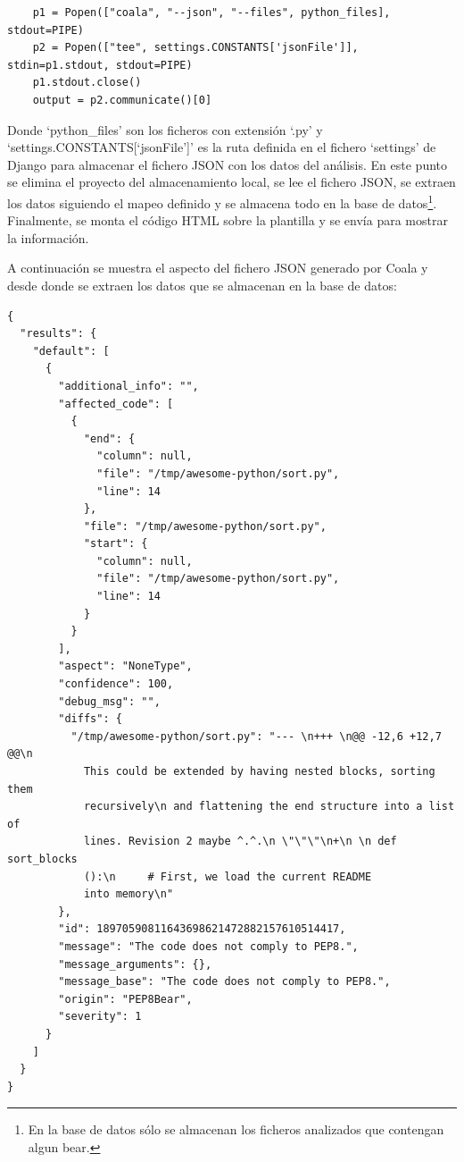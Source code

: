 \documentclass[a4paper, 12pt]{book}
\begin{document}
{\footnotesize
\begin{verbatim}
    p1 = Popen(["coala", "--json", "--files", python_files], stdout=PIPE)
    p2 = Popen(["tee", settings.CONSTANTS['jsonFile']], stdin=p1.stdout, stdout=PIPE)
    p1.stdout.close()
    output = p2.communicate()[0]
\end{verbatim}
}

Donde `python\_files' son los ficheros con extensión `.py' y `settings.CONSTANTS[`jsonFile']' es la ruta definida en el fichero `settings' de Django para almacenar el fichero JSON con los datos del análisis. En este punto se elimina el proyecto del almacenamiento local, se lee el fichero JSON, se extraen los datos siguiendo el mapeo definido y se almacena todo en la base de datos\footnote{En la base de datos sólo se almacenan los ficheros analizados que contengan algun bear.}. Finalmente, se monta el código HTML sobre la plantilla y se envía para mostrar la información.

A continuación se muestra el aspecto del fichero JSON generado por Coala y desde donde se extraen los datos que se almacenan en la base de datos:

{\footnotesize
\begin{verbatim}
{
  "results": {
    "default": [
      {
        "additional_info": "",
        "affected_code": [
          {
            "end": {
              "column": null,
              "file": "/tmp/awesome-python/sort.py",
              "line": 14
            },
            "file": "/tmp/awesome-python/sort.py",
            "start": {
              "column": null,
              "file": "/tmp/awesome-python/sort.py",
              "line": 14
            }
          }
        ],
        "aspect": "NoneType",
        "confidence": 100,
        "debug_msg": "",
        "diffs": {
          "/tmp/awesome-python/sort.py": "--- \n+++ \n@@ -12,6 +12,7 @@\n     
            This could be extended by having nested blocks, sorting them 
            recursively\n and flattening the end structure into a list of 
            lines. Revision 2 maybe ^.^.\n \"\"\"\n+\n \n def sort_blocks
            ():\n     # First, we load the current README 
            into memory\n"
        },
        "id": 18970590811643698621472882157610514417,
        "message": "The code does not comply to PEP8.",
        "message_arguments": {},
        "message_base": "The code does not comply to PEP8.",
        "origin": "PEP8Bear",
        "severity": 1
      }
    ]
  }
}
\end{verbatim}
}
\end{document}
